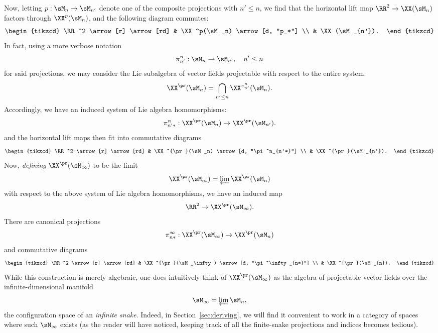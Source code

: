 \subsection{}
Now, letting $p : \sM_n \to \sM_{n'}$ denote one of the composite projections with $n' \le n$,
we find that the horizontal lift map
$\RR^2 \to \XX(\sM_n)$ factors through $\XX^p(\sM_n)$, and the following diagram commutes:
\[\begin{tikzcd}
        \RR^2 \arrow[r] \arrow[rd] & \XX^p(\sM_n) \arrow[d, "p_*"]  \\
                        & \XX(\sM_{n'}).
\end{tikzcd}\]
In fact, using a more verbose notation \[\pi^n_{n'} : \sM_n \to \sM_{n'},\quad n'\le n\] 
for said projections, we may consider the Lie subalgebra of vector fields projectable
with respect to the entire system:
\[ \XX^{\pr}(\sM_n) = \bigcap_{n'\le n} \XX^{\pi^n_{n'}}(\sM_n). \]
Accordingly, we have an induced system of Lie algebra homomorphisms:
\[ \pi^n_{n'*} : \XX^{\pr}(\sM_n) \to \XX^{\pr}(\sM_{n'}). \]
and the horizontal lift maps then fit into commutative diagrams
\[\begin{tikzcd}
        \RR^2 \arrow[r] \arrow[rd] & \XX^{\pr}(\sM_n) \arrow[d, "\pi^n_{n'*}"]  \\
                                   & \XX^{\pr}(\sM_{n'}).
\end{tikzcd}\]
Now, \emph{defining} $\XX^{\pr}(\sM_\infty)$ to be the limit
\[ \XX^{\pr}(\sM_\infty) = \varprojlim \XX^{\pr}(\sM_n) \]
with respect to the above system of Lie algebra homomorphisms,
we have an induced map
\[ \RR^2 \to \XX^{\pr}(\sM_\infty). \]
There are canonical projections \[\pi^\infty_{n*} : \XX^{\pr}(\sM_\infty) \to \XX^{\pr}(\sM_n)\]
and commutative diagrams
\[\begin{tikzcd}
        \RR^2 \arrow[r] \arrow[rd] & \XX^{\pr}(\sM_\infty) \arrow[d, "\pi^\infty_{n*}"]  \\
                                   & \XX^{\pr}(\sM_{n}).
\end{tikzcd}\]
While this construction is merely algebraic, one does intuitively think of
$\XX^{\pr}(\sM_\infty)$ as the algebra of projectable vector fields over
the infinite-dimensional manifold \[\sM_\infty = \varprojlim \sM_n,\]
the configuration space of an \emph{infinite snake}. Indeed, in Section~\ref{sec:deriving},
we will find it convenient to work in a category of spaces where such $\sM_\infty$ exists
(as the reader will have noticed, keeping track of all the finite-snake projections
and indices becomes tedious).

